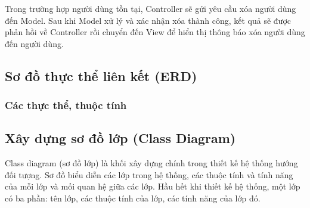 \documentclass{article}
\begin{document}
	 Trong trường hợp người dùng tồn tại, Controller sẽ gửi yêu cầu xóa người dùng đến Model. Sau khi Model xử lý và xác nhận xóa thành công, kết quả sẽ được phản hồi về Controller rồi chuyển đến View để hiển thị thông báo xóa người dùng đến người dùng.
	 
	 \subsection{Sơ đồ thực thể liên kết (ERD)}
	 \subsubsection{Các thực thể, thuộc tính}
	 
	 \subsection{Xây dựng sơ đồ lớp (Class Diagram)}
	 
	 Class diagram (sơ đồ lớp) là khối xây dựng chính trong thiết kế hệ thống hướng đối tượng. Sơ đồ biểu diễn các lớp trong hệ thống, các thuộc tính và tính năng của mỗi lớp và mối quan hệ giữa các lớp. Hầu hết khi thiết kế hệ thống, một lớp có ba phần: tên lớp, các thuộc tính của lớp, các tính năng của lớp đó.
\end{document}

